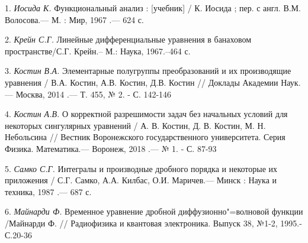 \litlist

1. {\it Иосида К.} Функциональный анализ : [учебник] / К. Иосида ; пер. с англ. В.М. Волосова.— М. : Мир, 1967 .— 624 с.

2. {\it Крейн С.Г.} Линейные дифференциальные уравнения в банаховом
пространстве/С.Г. Крейн.-- М.: Наука, 1967.--464 с.

3. {\it Костин В.А.} Элементарные полугруппы преобразований и их производящие уравнения / В.А. Костин, А.В. Костин, Д.В. Костин // Доклады Академии Наук.— Москва, 2014 .— Т. 455, № 2. - С. 142-146

4. {\it Костин А.В.} О корректной разрешимости задач без начальных условий для некоторых сингулярных уравнений / А. В. Костин, Д. В. Костин, М. Н. Небольсина // Вестник Воронежского государственного университета. Серия Физика. Математика.— Воронеж, 2018 .— № 1. - С. 87-93

5. {\it Самко С.Г.} Интегралы и производные дробного порядка и некоторые их приложения / С.Г. Самко, А.А. Килбас, О.И. Маричев.— Минск : Наука и техника, 1987 .— 687 с.

6. {\it Майнарди Ф.} Временное уравнение дробной диффузионно"=волновой функции /Майнарди Ф. // Радиофизика и квантовая электроника. Выпуск 38, №1-2, 1995.-С.20-36
